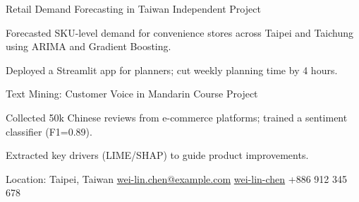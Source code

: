\documentclass[10pt]{article}
\begin{document}
\spacedhrule{0.8ex}{0.0ex}

\headedsectiontwo
{Retail Demand Forecasting in Taiwan}
{}
{Independent Project}
{\vspace{-2.0ex}
\begin{circlist}
  \item Forecasted SKU-level demand for convenience stores across Taipei and Taichung using ARIMA and Gradient Boosting.
  \item Deployed a Streamlit app for planners; cut weekly planning time by 4 hours.
\end{circlist}
}

\headedsectiontwo
{Text Mining: Customer Voice in Mandarin}
{}
{Course Project}
{\vspace{-2.0ex}
\begin{circlist}
  \item Collected 50k Chinese reviews from e-commerce platforms; trained a sentiment classifier (F1=0.89).
  \item Extracted key drivers (LIME/SHAP) to guide product improvements.
\end{circlist}
}

\spacedhrule{0.8ex}{0.0ex}
\begin{indentsection}
\end{indentsection}

\spacedhrule{0.8ex}{0.0ex}
\begin{center}
  Location: Taipei, Taiwan
  \hfill
  \Letter\hspace{0.1ex} \href{mailto:wei-lin.chen@example.com}{wei-lin.chen@example.com}
  \hfill
  \faLinkedin\hspace{0.1ex} \href{https://www.linkedin.com/in/wei-lin-chen}{wei-lin-chen}
  \hfill
  \Mobilefone\hspace{0.1ex} +886 912 345 678
\end{center}
\end{document}
